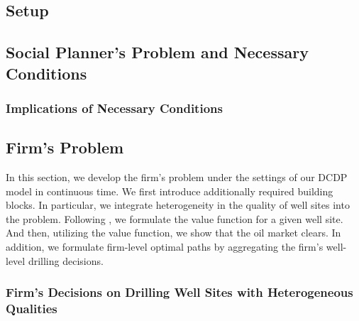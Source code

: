 \subsection{Setup}
\label{C3-SubSection:Setup}


\subsection{Social Planner's Problem and Necessary Conditions}
\label{C3-SubSection:Social-Planners-Problem-and-Necessary-Conditions}


\subsubsection{Implications of Necessary Conditions}
\label{C3-SubSubSection:Necessary-Conditions}


\subsection{Firm's Problem}
\label{C3-SubSection:Firms-Problem}
In this section, we develop the firm's problem under the settings of our DCDP model in continuous time. We first introduce additionally required building blocks. In particular, we integrate heterogeneity in the quality of well sites into the problem. Following \cite{Estimation-of-Dynamic-Discrete-Choice-Models-in-Continuous-Time_ABBE_2016}, we formulate the value function for a given well site. And then, utilizing the value function, we show that the oil market clears. In addition, we formulate firm-level optimal paths by aggregating the firm's well-level drilling decisions. 

\subsubsection{Firm's Decisions on Drilling Well Sites with Heterogeneous Qualities}
\label{C3-SubSubSection:Firms-Decisions-on-Drilling-Well-Sites-with-Heterogeneous-Qualities}


